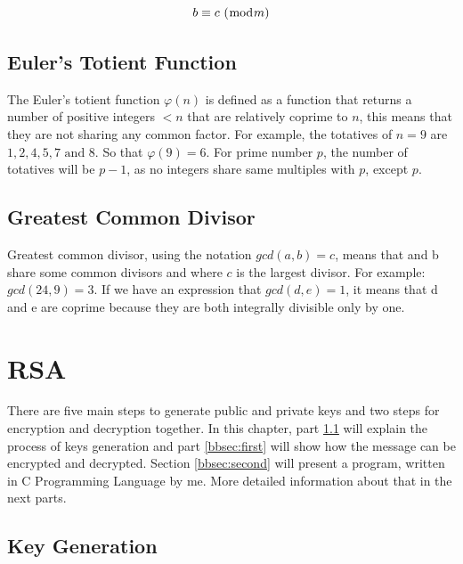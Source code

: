 \documentclass[a4paper, 12pt]{article}
\begin{document}
\begin{equation*}
  b \equiv c \text{ } (\bmod m)\\
  \end{equation*}

\subsection{Euler's Totient Function}
\label{bsec:euler}

The Euler's totient function $\varphi(n)$ is defined as a function that returns a number of positive integers
$<n$ that are relatively coprime to $n$, this means that they are not sharing any common factor. For
example, the totatives of $n = 9$ are $1, 2, 4, 5, 7 \text{ and } 8$. So that $\varphi(9) = 6$. For prime number $p$, the
number of totatives will be $p - 1$, as no integers share same multiples with $p$, except $p$.\\

\subsection{Greatest Common Divisor}
\label{bsec:gcd}

Greatest common divisor, using the notation $gcd(a,b)=c$, means that and b share some common
divisors and where $c$ is the largest divisor. For example: $gcd(24,9)=3$. If we have an
expression that $gcd(d,e)=1$, it means that d and e are coprime because they are both integrally
divisible only by one.\\

\section{RSA}
\label{sec:rsa}

There are five main steps to generate public and private keys and two steps for encryption and
decryption together. In this chapter, part \ref{bsec:key} will explain the process of keys generation and part
\ref{bbsec:first} will show how the message can be encrypted and decrypted. Section \ref{bbsec:second} will present a program, written
in C Programming \cite{Clang} Language by me. More detailed information about that in the next parts.

\subsection{Key Generation}
\label{bsec:key}
\end{document}
